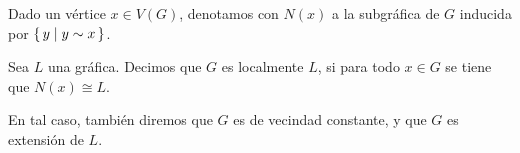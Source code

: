 \documentclass[beamer]{standalone}
\begin{document}
\begin{standaloneframe}
  Dado un vértice $x\in V(G)$, denotamos con $N(x)$ a la subgráfica de
  $G$ inducida por $\left\{\,y\mid y\sim x\,\right\}$.

  \pause\bigskip

  Sea $L$ una gráfica. Decimos que $G$ es \alert{localmente $L$}, si
  para todo $x\in G$ se tiene que $N(x)\cong L$.

  \pause\bigskip

  En tal caso, también diremos que $G$ es de \alert{vecindad
    constante}, y que $G$ es \alert{extensión} de $L$.
\end{standaloneframe}
\end{document}
